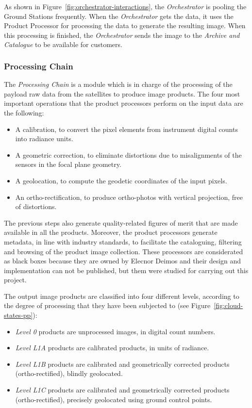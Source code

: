 As shown in Figure~\ref{fig:orchestrator-interactions}, the \emph{Orchestrator} is
pooling the Ground Stations frequently. When the \emph{Orchestrator} gets the data,
it uses the Product Processor for processing the data to generate the resulting
image. When this processing is finished, the \emph{Orchestrator} sends the image to
the \emph{Archive and Catalogue} to be available for customers.



\subsubsection{Processing Chain}
\label{subsub:processors}

The \emph{Processing Chain} is a module which is in charge of the processing of the
payload raw data from the satellites to produce image products. The four most
important operations that the product processors perform on the input data are
the following:
\begin{itemize}
\item A calibration, to convert the pixel elements from instrument digital counts into radiance units.
\item A geometric correction, to eliminate distortions due to misalignments of the sensors in the focal plane geometry.
\item A geolocation, to compute the geodetic coordinates of the input pixels.
\item An ortho-rectification, to produce ortho-photos with vertical projection, free of distortions.
\end{itemize}

The previous steps also generate quality-related figures of merit that are made
available in all the products. Moreover, the product processors generate
metadata, in line with industry standards, to facilitate the cataloguing,
filtering and browsing of the product image collection. These processors are
considerated as black boxes because they are owned by Elecnor Deimos and their
design and implementation can not be published, but them were studied for
carrying out this project.

The output image products are classified into four different levels, according to the degree of processing that they have been subjected to (see Figure~\ref{fig:cloud-states-pp}):
\begin{itemize}

\item \emph{Level 0} products are unprocessed images, in digital count numbers.
\item \emph{Level L1A} products are calibrated products, in units of radiance.
\item \emph{Level L1B} products are calibrated and geometrically corrected products (ortho-rectified), blindly geolocated.
\item \emph{Level L1C} products are calibrated and geometrically corrected products (ortho-rectified), precisely geolocated using ground control points.
\end{itemize}

